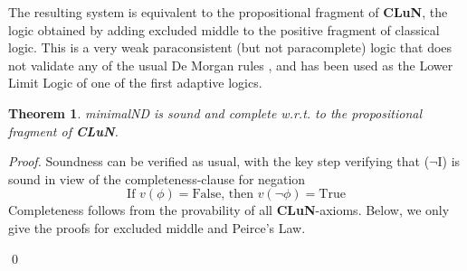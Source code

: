 \documentclass[]{article}
\newtheorem{theorem}{Theorem}
\newcommand{\TurnOne}[2]
    { {#1}\vdash_{\textbf{\sf 1}}  {#2}}
\newcommand{\TurnTwo}[2]
    { {#1}\vdash_{\textbf{\sf 2}}  {#2}}
\newcommand{\TurnThree}[2]
    { {#1}\vdash_{\textbf{\sf 3}}  {#2}}
\newcommand{\TurnFour}[2]
    { {#1}\vdash_{\textbf{\sf 4}}  {#2}}
\newcommand{\TurnFive}[2]
    { {#1}\vdash_{\textbf{\sf 5}}  {#2}}
\newcommand{\TurnSix}[2]
    { {#1}\vdash_{\textbf{\sf 6}}  {#2}}
\newcommand{\TurnSeven}[2]
    { {#1}\vdash_{\textbf{\sf 7}}  {#2}}
\begin{document}
The resulting system is equivalent to the propositional fragment of \textbf{CLuN}, the logic obtained by adding excluded middle to the positive fragment of classical logic. This is a very weak paraconsistent (but not paracomplete) logic that does not validate any of the usual De Morgan rules \cite{Batens:LogiqueAnalyse:1980}, and has been used as the Lower Limit Logic of one of the first adaptive logics.

\begin{theorem}\label{thm:clun}
    {\sf minimalND} is sound and complete w.r.t. to the propositional fragment of \textbf{CLuN}.
\end{theorem}
\noindent\textsl{Proof.} Soundness can be verified as usual, with the key step verifying that ($\neg$I) is sound in view of the completeness-clause for negation
\[
   \text{If } v(\phi) = \mathrm{False} \text{, then } v(\neg \phi) = \mathrm{True}\tag{C$\neg$}\label{eq:negclause}
\]
Completeness follows from the provability of all \textbf{CLuN}-axioms. Below, we only give the proofs for excluded middle and Peirce's Law.
\qed
\end{document}
